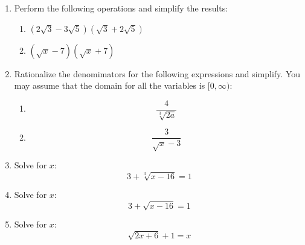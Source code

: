 \documentclass[letterpaper,12pt,fleqn]{article}
\begin{document}
\begin{enumerate}
  \newpage
  
\item Perform the following operations and simplify the results:
  \begin{enumerate}
  \item $(2\sqrt{3}-3\sqrt{5})(\sqrt{3}+2\sqrt{5})$

    \vspace{3in}
      
  \item $(\sqrt{x}-7)(\sqrt{x}+7)$

    \vspace{3in}
      
  \end{enumerate}

  \newpage

\item Rationalize the denomimators for the following expressions and simplify. You may
  assume that the domain for all the variables is $[0,\infty)$:
  \begin{enumerate}
  \item \[\frac{4}{\sqrt[3]{2a}}\]

    \vspace{3in}
      
  \item \[\frac{3}{\sqrt{x}-3}\]

    \vspace{3in}
      
  \end{enumerate}

  \newpage
  
\item Solve for $x$:
  \[3+\sqrt[3]{x-16}=1\]

    \vspace{2in}
      
\item Solve for $x$:
  \[3+\sqrt{x-16}=1\]

    \vspace{2in}
      

\item Solve for $x$:
  \[\sqrt{2x+6}+1=x\]
\end{enumerate}
\end{document}
